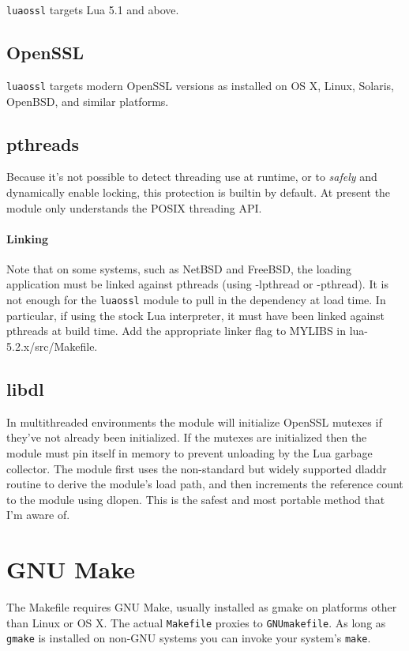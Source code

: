 \documentclass[11pt, oneside]{memoir}
\newcommand*{\luaossl}[0]{\texttt{luaossl}\xspace}
\begin{document}
\luaossl targets Lua 5.1 and above.

\subsection{OpenSSL}

\luaossl targets modern OpenSSL versions as installed on OS X, Linux, Solaris, OpenBSD, and similar platforms.

\subsection{pthreads}

Because it's not possible to detect threading use at runtime, or to \emph{safely} and dynamically enable locking, this protection is builtin by default. At present the module only understands the POSIX threading API.

\paragraph{Linking}
Note that on some systems, such as NetBSD and FreeBSD, the loading application must be linked against pthreads (using -lpthread or -pthread). It is not enough for the \luaossl module to pull in the dependency at load time. In particular, if using the stock Lua interpreter, it must have been linked against pthreads at build time. Add the appropriate linker flag to MYLIBS in lua-5.2.x/src/Makefile.

\subsection{libdl}

In multithreaded environments the module will initialize OpenSSL mutexes if they've not already been initialized. If the mutexes are initialized then the module must pin itself in memory to prevent unloading by the Lua garbage collector. The module first uses the non-standard but widely supported dladdr routine to derive the module's load path, and then increments the reference count to the module using dlopen. This is the safest and most portable method that I'm aware of.

\section{GNU Make}

The Makefile requires GNU Make, usually installed as gmake on platforms other than Linux or OS X. The actual \texttt{Makefile} proxies to \texttt{GNUmakefile}. As long as \texttt{gmake} is installed on non-GNU systems you can invoke your system's \texttt{make}.
\end{document}
